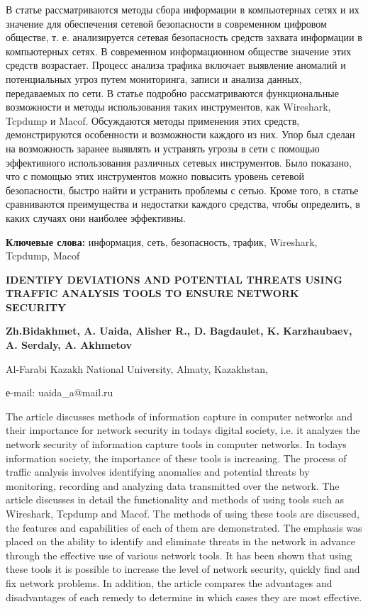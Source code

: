В статье рассматриваются методы сбора информации в компьютерных сетях и
их значение для обеспечения сетевой безопасности в современном цифровом
обществе, т. е. анализируется сетевая безопасность средств захвата
информации в компьютерных сетях. В современном информационном обществе
значение этих средств возрастает. Процесс анализа трафика включает
выявление аномалий и потенциальных угроз путем мониторинга, записи и
анализа данных, передаваемых по сети. В статье подробно рассматриваются
функциональные возможности и методы использования таких инструментов,
как Wireshark, Tcpdump и Macof. Обсуждаются методы применения этих
средств, демонстрируются особенности и возможности каждого из них. Упор
был сделан на возможность заранее выявлять и устранять угрозы в сети с
помощью эффективного использования различных сетевых инструментов. Было
показано, что с помощью этих инструментов можно повысить уровень сетевой
безопасности, быстро найти и устранить проблемы с сетью. Кроме того, в
статье сравниваются преимущества и недостатки каждого средства, чтобы
определить, в каких случаях они наиболее эффективны.

{\bfseries Ключевые слова:} информация, сеть, безопасность, трафик,
Wireshark, Tcpdump, Macof
\newpage
\begin{center}
{\large\bfseries IDENTIFY DEVIATIONS AND POTENTIAL THREATS USING TRAFFIC
ANALYSIS TOOLS TO ENSURE NETWORK SECURITY}

{\bfseries Zh.Bidakhmet, A. Uaida, Alisher R., D. Bagdaulet, K.
Karzhaubaev, A. Serdaly, A. Akhmetov}

Al-Farabi Kazakh National University, Almaty, Kazakhstan,

е-mail: uaida\_a@mail.ru
\end{center}

The article discusses methods of information capture in computer
networks and their importance for network security in
today\textquotesingle s digital society, i.e. it analyzes the network
security of information capture tools in computer networks. In
today\textquotesingle s information society, the importance of these
tools is increasing. The process of traffic analysis involves
identifying anomalies and potential threats by monitoring, recording and
analyzing data transmitted over the network. The article discusses in
detail the functionality and methods of using tools such as Wireshark,
Tcpdump and Macof. The methods of using these tools are discussed, the
features and capabilities of each of them are demonstrated. The emphasis
was placed on the ability to identify and eliminate threats in the
network in advance through the effective use of various network tools.
It has been shown that using these tools it is possible to increase the
level of network security, quickly find and fix network problems. In
addition, the article compares the advantages and disadvantages of each
remedy to determine in which cases they are most effective.

